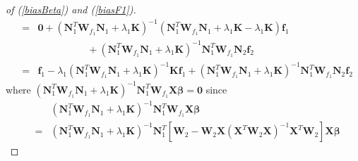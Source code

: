 \documentclass[article,lineno]{biometrika}
\begin{document}
\begin{proof} [of (\ref{biasBeta}) and (\ref{biasF1})]
\begin{eqnarray*}
   &=&
\boldsymbol 0 
 + (\boldsymbol N_1^T \boldsymbol W_{f_1}  \boldsymbol N_1 + \lambda_1 \boldsymbol K)^{-1}  
(\boldsymbol N_1^T \boldsymbol W_{f_1} \boldsymbol N_{1}+ \lambda_1 \boldsymbol K
 - \lambda_1 \boldsymbol K)
  \boldsymbol f_1\\
&&\quad\quad\quad\quad\quad
+ 
(\boldsymbol N_1^T \boldsymbol W_{f_1}  \boldsymbol N_1
+ 
 \lambda_1 \boldsymbol K)^{-1}  \boldsymbol N_1^T \boldsymbol W_{f_1}
\boldsymbol N_{2} \boldsymbol f_2\\
     &=&
\boldsymbol f_1 
- \lambda_1 
(\boldsymbol N_1^T \boldsymbol W_{f_1}  \boldsymbol N_1 +  \lambda_1 \boldsymbol K)^{-1}   \boldsymbol K \boldsymbol f_1
+ 
(\boldsymbol N_1^T \boldsymbol W_{f_1}  \boldsymbol N_1 +  \lambda_1 \boldsymbol K)^{-1}  \boldsymbol N_1^T \boldsymbol W_{f_1}
\boldsymbol N_{2} \boldsymbol f_2 
\end{eqnarray*}
where
$(\boldsymbol N_1^T \boldsymbol W_{f_1}  \boldsymbol N_1
  + \lambda_1 \boldsymbol K)^{-1}  \boldsymbol N_1^T \boldsymbol W_{f_1}
  \boldsymbol X \boldsymbol \beta =  \boldsymbol 0$ 
since 
\begin{eqnarray*}
&&(\boldsymbol N_1^T \boldsymbol W_{f_1}  \boldsymbol N_1
  + \lambda_1 \boldsymbol K)^{-1}  \boldsymbol N_1^T \boldsymbol W_{f_1}
  \boldsymbol X \boldsymbol \beta \\
  &=&
(\boldsymbol N_1^T \boldsymbol W_{f_1}  \boldsymbol N_1
  + \lambda_1 \boldsymbol K)^{-1}  \boldsymbol N_1^T
  \left[
\boldsymbol W_2 - \boldsymbol W_2\boldsymbol X(\boldsymbol X^T  \boldsymbol W_2\boldsymbol X)^{-1}  \boldsymbol X^T  \boldsymbol W_2
  \right]
  \boldsymbol X \boldsymbol \beta 

\end{eqnarray*}
\end{proof}
\end{document}
